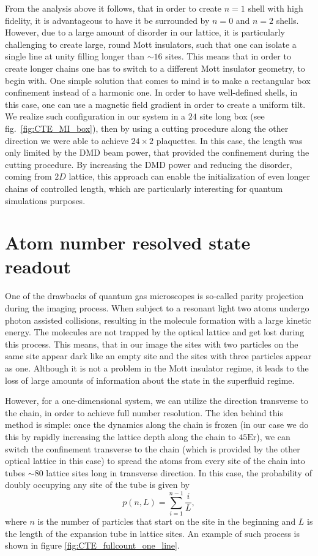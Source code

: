 From the analysis above it follows, that in order to create $n=1$ shell with high fidelity, it is advantageous to have it be surrounded by $n=0$ and $n=2$ shells. However, due to a large amount of disorder in our lattice, it is particularly challenging to create large, round Mott insulators, such that one can isolate a single line at unity filling longer than $\sim 16$ sites. This means that in order to create longer chains one has to switch to a different Mott insulator geometry, to begin with. One simple solution that comes to mind is to make a rectangular box confinement instead of a harmonic one. In order to have well-defined shells, in this case, one can use a magnetic field gradient in order to create a uniform tilt. We realize such configuration in our system in a $24$ site long box (see fig.~\ref{fig:CTE_MI_box}), then by using a cutting procedure along the other direction we were able to achieve $24\times 2$ plaquettes. In this case, the length was only limited by the DMD beam power, that provided the confinement during the cutting procedure. By increasing the DMD power and reducing the disorder, coming from $2D$ lattice, this approach can enable the initialization of even longer chains of controlled length, which are particularly interesting for quantum simulations purposes.

\section{Atom number resolved state readout}

One of the drawbacks of quantum gas microscopes is so-called parity projection during the imaging process. When subject to a resonant light two atoms undergo photon assisted collisions, resulting in the molecule formation with a large kinetic energy. The molecules are not trapped by the optical lattice and get lost during this process. This means, that in our image the sites with two particles on the same site appear dark like an empty site and the sites with three particles appear as one. Although it is not a problem in the Mott insulator regime, it leads to the loss of large amounts of information about the state in the superfluid regime. 

However, for a one-dimensional system, we can utilize the direction transverse to the chain, in order to achieve full number resolution. The idea behind this method is simple: once the dynamics along the chain is frozen (in our case we do this by rapidly increasing the lattice depth along the chain to $45 \textrm{Er}$), we can switch the confinement transverse to the chain (which is provided by the other optical lattice in this case) to spread the atoms from every site of the chain into tubes $\sim 80$ lattice sites long in transverse direction. In this case, the probability of doubly occupying any site of the tube is given by
\begin{equation}
p(n,L) = \sum_{i=1}^{n-1}\frac{i}{L},
\end{equation}
where $n$ is the number of particles that start on the site in the beginning and $L$ is the length of the expansion tube in lattice sites. An example of such process is shown in figure \ref{fig:CTE_fullcount_one_line}.

